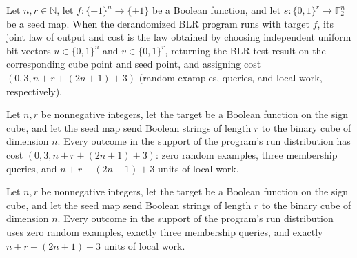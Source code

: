 \begin{theorem}
\label{FABL.runWithCost_derandomizedBLRProgram}
\leanok
{}
Let $n,r\in\mathbb{N}$, let $f:\{\pm1\}^n\to\{\pm1\}$ be a Boolean function, and let
$s:\{0,1\}^r\to\mathbb{F}_2^n$ be a seed map. When the derandomized BLR program runs
with target $f$, its joint law of output and cost is the law obtained by choosing
independent uniform bit vectors $u\in\{0,1\}^n$ and $v\in\{0,1\}^r$, returning the BLR
test result on the corresponding cube point and seed point, and assigning cost
$(0,3,n+r+(2n+1)+3)$ (random examples, queries, and local work, respectively).
\end{theorem}

\begin{theorem}
\label{FABL.derandomizedBLRProgram_cost_eq_of_mem_support}
\leanok
{}
Let $n,r$ be nonnegative integers, let the target be a Boolean function on the sign
cube, and let the seed map send Boolean strings of length $r$ to the binary cube of
dimension $n$. Every outcome in the support of the program’s run distribution has cost
$(0,3,n+r+(2n+1)+3)$: zero random examples, three membership queries, and $n+r+(2n+1)+3$
units of local work.
\end{theorem}

\begin{theorem}
\label{FABL.derandomizedBLRProgram_resources_of_mem_support}
\leanok
{}
Let $n,r$ be nonnegative integers, let the target be a Boolean function on the sign
cube, and let the seed map send Boolean strings of length $r$ to the binary cube of
dimension $n$. Every outcome in the support of the program’s run distribution uses zero
random examples, exactly three membership queries, and exactly $n+r+(2n+1)+3$ units of
local work.
\end{theorem}

